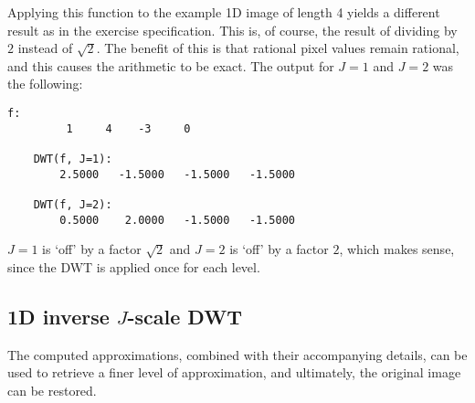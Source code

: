 Applying this function to the example 1D image of length 4 yields a different result as in the exercise specification.
This is, of course, the result of dividing by \(2\) instead of \(\sqrt{2}\).
The benefit of this is that rational pixel values remain rational, and this causes the arithmetic to be exact.
The output for \(J=1\) and \(J=2\) was the following:
\begin{lstlisting}[basicstyle=\ttfamily\small]
    f:
         1     4    -3     0

    DWT(f, J=1):
        2.5000   -1.5000   -1.5000   -1.5000

    DWT(f, J=2):
        0.5000    2.0000   -1.5000   -1.5000
\end{lstlisting}
\(J=1\) is `off' by a factor \(\sqrt{2}\) and \(J=2\) is `off' by a factor \(2\), which makes sense, since the DWT is applied once for each level.

\subsection{\texorpdfstring{1D inverse \(J\)-scale DWT}{1D inverse J-scale DWT}}
The computed approximations, combined with their accompanying details, can be used to retrieve a finer level of approximation, and ultimately, the original image can be restored.

\clearpage